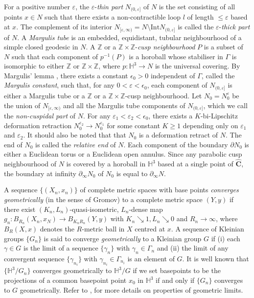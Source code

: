 \documentclass{amsart}
\theoremstyle{definition}
\numberwithin{figure}{section}
\numberwithin{equation}{section}
\newcommand{\blackboard}[1]{\ensuremath{\mathbb{#1}}}
\newcommand{\hyperbolic}{\blackboard{H}}
\newcommand{\integers}{\blackboard{Z}} %
\def\hh{\hyperbolic}
\def\part{\partial}
\def\wh{\widehat}
\def\ve{\varepsilon}
\def\G{\Gamma}
\def\ve{\varepsilon}
\def\G{\Gamma}
\begin{document}
For a positive number $\varepsilon$, the $\varepsilon$-\textit{thin part} 
$N_{(0,\varepsilon]}$ of $N$ is the set consisting of all points 
$x\in N$ such that there exists a non-contractible loop $l$ of length $\leq \varepsilon$ based at $x$.
The complement of its interior $N_{[\varepsilon,\infty)}=N\setminus \mathrm{Int} N_{(0,\varepsilon]}$ is called the $\varepsilon$-\emph{thick part} of $N$.
A \emph{Margulis tube} is an embedded, equidistant, tubular neighbourhood of a simple closed geodesic in $N$.
A $\integers$ or a $\integers\times \integers$-\emph{cusp neighbourhood } $P$ is a subset of $N$ such that each component of $p^{-1}(P)$ is a horoball whose stabiliser in $\Gamma$ is isomorphic to either $\integers$ or $\integers \times \integers$, where $p:\hh^3\rightarrow N$ is the universal covering.
By  Margulis' lemma \cite[Corollary 5.10.2]{th1}, there exists a constant $\epsilon_0>0$ independent 
of $\G$, called the \emph{Margulis constant}, such that, for any 
$0<\ve< \epsilon_0$, each component of 
$N_{(0,\ve]}$ is either a Margulis tube or a $\integers$ or a $\integers\times \integers$-cusp neighbourhood.
Let $N_0=N_0^\ve$ be the union of $N_{[\varepsilon,\infty)}$ and all the Margulis tube components of $N_{(0,\varepsilon]}$, which we call the {\it non-cuspidal part} of $N$.
For any $\ve_1 <\ve_2< \epsilon_0$, there exists a  $K$-bi-Lipschitz deformation retraction 
$N_0^{\ve_2}\rightarrow N_0^{\ve_1}$ for some constant $K\geq 1$ depending only on $\ve_1$ and $\ve_2$. 
It should also be noted that that $N_0$ is a deformation retract of  $N$.
The end of $N_0$ is called the \emph{relative end} of $N$.
Each component of the boundary $\part N_0$ is 
either a Euclidean torus or a Euclidean open annulus. 
Since any parabolic cusp neighbourhood  of $N$ is covered by a horoball in $\hh^3$ based at a single point of $\wh{\mathbf{C}}$, the boundary at infinity $\part_\infty N_0$ of $N_0$ is equal to $\part_\infty N$.


A sequence $\{(X_n,x_n)\}$ of complete metric spaces with base points \emph{converges geometrically} (in the sense of Gromov) to a complete 
metric space $(Y,y)$ if there exist $(K_n, L_n)$-quasi-isometric, $L_n$-dense map $g_n:B_{R_n}(X_n, x_N)\rightarrow B_{K_nR_n}(Y,y)$ with $K_n\searrow 1, L_n \searrow 0$ and $R_n\rightarrow \infty$, where $B_R(X,x)$ denotes the $R$-metric ball in $X$ centred at $x$.
A sequence of Kleinian groups $\{G_n\}$ is said to converge \emph{geometrically} to a Kleinian group $G$ if (i) each $\gamma\in G$ is the limit of a sequence $\{\gamma_n\}$ with $\gamma_n\in \Gamma_n$ and (ii) the limit of any convergent sequence $\{\gamma_{n_i}\}$ with $\gamma_{n_i}\in \Gamma_{n_i}$ is an element of $G$.
It is well known that $\{\hh^3/G_n\}$ converges geometrically to $\hh^3/G$ if we set basepoints to be the projections of a common basepoint point $x_0$ in $\hh^3$ if and only if $\{G_n\}$ converges to $G$ geometrically.
Refer to \cite{jm}, \cite[Chapter E]{bp} for more details on properties of geometric limits.
\end{document}
